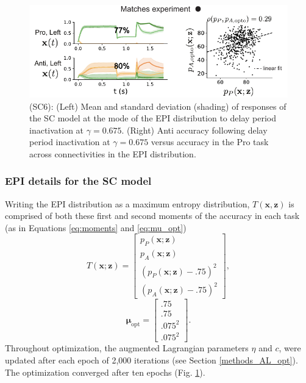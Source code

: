 \documentclass[11pt]{article}
\begin{document}
\begin{figure}
\begin{center}
\includegraphics[scale=1.2]{figures/figSC6/figSC6.pdf}
\end{center}
\caption{\small (SC6): 
(Left) Mean and standard deviation (shading) of responses of the SC model at the mode of the EPI distribution to delay period inactivation at $\gamma = 0.675$.  (Right) Anti accuracy following delay period inactivation at $\gamma = 0.675$ versus accuracy in the Pro task across connectivities in the EPI distribution.
}
\label{fig:SC6}
\end{figure}

\subsubsection{EPI details for the SC model} \label{methods_sc_epi}
Writing the EPI distribution as a maximum entropy distribution, $T(\mathbf{x}, \mathbf{z})$ is comprised of both these first and second moments of the accuracy in each task (as in Equations \ref{eq:moments} and \ref{eq:mu_opt})
\begin{equation} 
T(\mathbf{x}; \mathbf{z}) = \begin{bmatrix} p_P(\mathbf{x}; \mathbf{z}) \\ p_A(\mathbf{x}; \mathbf{z}) \\ \left(p_P(\mathbf{x}; \mathbf{z}) - .75 \right)^2 \\ \left(p_A(\mathbf{x}; \mathbf{z}) - .75 \right)^2 \end{bmatrix},
\end{equation}
\begin{equation} 
\bm{\mu}_{\text{opt}} = \begin{bmatrix} .75 \\ .75 \\ .075^2 \\ .075^2 \end{bmatrix}.
\end{equation}
Throughout optimization, the augmented Lagrangian parameters $\eta$ and $c$, were updated after each epoch of 2,000 iterations (see Section \ref{methods_AL_opt}).  
The optimization converged after ten epochs (Fig. \ref{fig:SC6}).
\end{document}
